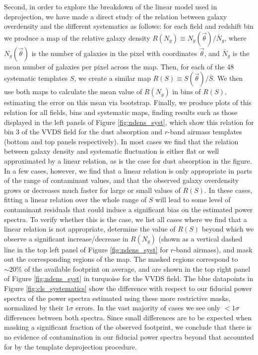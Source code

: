 \documentclass[a4paper,11pt]{article}
\newcommand{\nv}{\vec{\theta}}
\begin{document}
      Second, in order to explore the breakdown of the linear model used in deprojection, we have made a direct study of the relation between galaxy overdensity and the different systematics as follows: for each field and redshift bin we produce a map of the relative galaxy density $R(N_g)\equiv N_g(\nv)/\bar{N}_g$, where $N_g(\nv)$ is the number of galaxies in the pixel with coordinates $\nv$, and $\bar{N}_g$ is the mean number of galaxies per pixel across the map. Then, for each of the 48 systematic templates $S$, we create a similar map $R(S)\equiv S(\nv)/\bar{S}$. We then use both maps to calculate the mean value of $R(N_g)$ in bins of $R(S)$, estimating the error on this mean via bootstrap. Finally, we produce plots of this relation for all fields, bins and systematic maps, finding results such as those displayed in the left panels of Figure \ref{fig:ndens_syst}, which show this relation for bin 3 of the VVDS field for the dust absorption and $r$-band airmass templates (bottom and top panels respectively). In most cases we find that the relation between galaxy density and systematic fluctuation is either flat or well approximated by a linear relation, as is the case for dust absorption in the figure. In a few cases, however, we find that a linear relation is only appropriate in parts of the range of contaminant values, and that the observed galaxy overdensity grows or decreases much faster for large or small values of $R(S)$. In these cases, fitting a linear relation over the whole range of $S$ will lead to some level of contaminant residuals that could induce a significant bias on the estimated power spectra. To verify whether this is the case, we list all cases where we find that a linear relation is not appropriate, determine the value of $R(S)$ beyond which we observe a significant increase/decrease in $R(N_g)$ (shown as a vertical dashed line in the top left panel of Figure \ref{fig:ndens_syst} for $r$-band airmass), and mask out the corresponding regions of the map. The masked regions correspond to $\sim20\%$ of the available footprint on average, and are shown in the top right panel of Figure \ref{fig:ndens_syst} in turquoise for the VVDS field. The blue datapoints in Figure \ref{fig:cls_systematics} show the difference with respect to our fiducial power spectra of the power spectra estimated using these more restrictive masks, normalized by their $1\sigma$ errors. In the vast majority of cases we see only $<1\sigma$ differences between both spectra. Since small differences are to be expected when masking a significant fraction of the observed footprint, we conclude that there is no evidence of contamination in our fiducial power spectra beyond that accounted for by the template deprojection procedure.
\end{document}
